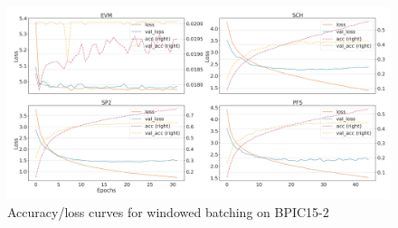 \begin{figure}[!htb]
    \centering
    \includegraphics[width=\textwidth]{gfx/bpic2015_2/windowed_loss_acc_curve.png}
    \caption{Accuracy/loss curves for windowed batching on BPIC15-2}
\end{figure}
\FloatBarrier


